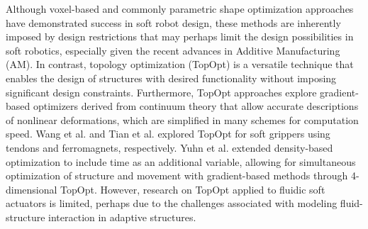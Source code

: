 Although voxel-based \cite{Kriegman2020,Cheney2013} and commonly parametric shape optimization \cite{Coevoet2017,Manns2018Jan,Morzadec2019Apr} approaches have demonstrated success in soft robot design, these methods are inherently imposed by design restrictions that may perhaps limit the design possibilities in soft robotics, especially given the recent advances in Additive Manufacturing (AM). In contrast, topology optimization \cite{Bendsoe2003,Gain2013Dec,Zhang2017Topo,Talischi2012Mar,Vasista2013Jul} (TopOpt) is a versatile technique that enables the design of structures with desired functionality without imposing significant design constraints. Furthermore, TopOpt approaches explore gradient-based optimizers derived from continuum theory that allow accurate descriptions of nonlinear deformations, which are simplified in many schemes for computation speed. Wang et al. \cite{Wang2020Nov} and Tian et al. \cite{Tian2020May} explored TopOpt for soft grippers using tendons and ferromagnets, respectively. Yuhn et al. \cite{Yuhn2023Feb} extended density-based optimization to include time as an additional variable, allowing for simultaneous optimization of structure and movement with gradient-based methods through 4-dimensional TopOpt. However, research on TopOpt applied to fluidic soft actuators is limited, perhaps due to the challenges associated with modeling fluid-structure interaction in adaptive structures.

\vspace{-2mm}
